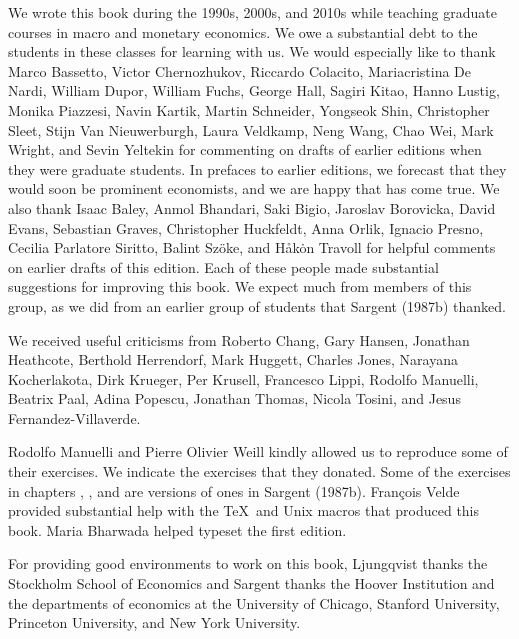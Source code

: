   \noindent We wrote this book during the 1990s, 2000s, and  2010s while
teaching graduate courses
in macro and monetary economics.
 We owe a substantial  debt to
the students in these classes for learning with us. We would
especially like to thank Marco Bassetto,
Victor Chernozhukov,
Riccardo Colacito, Mariacristina De Nardi, William Dupor, William
Fuchs, George Hall, Sagiri Kitao, Hanno Lustig,
 Monika Piazzesi, Navin Kartik,
Martin Schneider,   Yongseok Shin, Christopher
Sleet, Stijn Van Nieuwerburgh, Laura Veldkamp, Neng  Wang, Chao
Wei, Mark Wright, and Sevin Yeltekin for commenting on drafts of earlier editions when they
were graduate students.  In prefaces to earlier editions, we forecast that they would soon be prominent
economists, and we are happy that  has come true.
We also thank
 Isaac Baley, Anmol Bhandari,  Saki Bigio,  Jaroslav Borovicka,  David Evans, Sebastian Graves, Christopher Huckfeldt, Anna Orlik,  Ignacio Presno, Cecilia Parlatore Siritto,  Balint Sz\"oke, and    H\aa k\.on Travoll for helpful comments
 on earlier drafts of this edition.  Each
of these people made substantial suggestions for improving this
book. We expect much from members of this group, as we did from an
earlier group of students that Sargent  (1987b) thanked.


We received useful
 criticisms from Roberto Chang,
Gary Hansen, Jonathan Heathcote, Berthold Herrendorf,  Mark
Huggett, Charles Jones, Narayana Kocherlakota, Dirk Krueger, Per
Krusell, Francesco Lippi, Rodolfo Manuelli, Beatrix Paal, Adina
Popescu, Jonathan Thomas,  Nicola Tosini, and Jesus Fernandez-Villaverde.


Rodolfo Manuelli and Pierre Olivier Weill kindly allowed us to reproduce some of their
exercises. We indicate the exercises that  they donated.
 Some of the exercises in chapters
, ,  and  are versions of ones in Sargent (1987b).
Fran\c cois Velde provided  substantial help with the \TeX \ and
Unix macros that produced this book.
 Maria Bharwada helped  typeset the first edition.

For providing good environments to work on this book, Ljungqvist
thanks the Stockholm School of Economics and Sargent thanks the
Hoover Institution and the departments of economics at the
University of Chicago, Stanford University, Princeton University, and New York
University.
